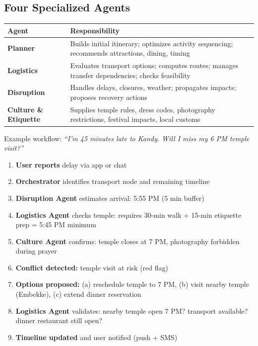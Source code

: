 \documentclass[11pt]{article}
\begin{document}
\subsection{Four Specialized Agents}

\begin{table}[H]\centering\small
\begin{tabular}{|l|p{3.5in}|}
\hline
\textbf{Agent} & \textbf{Responsibility} \\
\hline
\textbf{Planner} & Builds initial itinerary; optimizes activity sequencing; recommends attractions, dining, timing \\
\hline
\textbf{Logistics} & Evaluates transport options; computes routes; manages transfer dependencies; checks feasibility \\
\hline
\textbf{Disruption} & Handles delays, closures, weather; propagates impacts; proposes recovery actions \\
\hline
\textbf{Culture \& Etiquette} & Supplies temple rules, dress codes, photography restrictions, festival impacts, local customs \\
\hline
\end{tabular}
\end{table}

Example workflow: \textit{``I'm 45 minutes late to Kandy. Will I miss my 6 PM temple visit?''}

\begin{enumerate}
    \item \textbf{User reports} delay via app or chat
    \item \textbf{Orchestrator} identifies transport node and remaining timeline
    \item \textbf{Disruption Agent} estimates arrival: 5:55 PM (5 min buffer)
    \item \textbf{Logistics Agent} checks temple: requires 30-min walk + 15-min etiquette prep = 5:45 PM minimum
    \item \textbf{Culture Agent} confirms: temple closes at 7 PM, photography forbidden during prayer
    \item \textbf{Conflict detected:} temple visit at risk (red flag)
    \item \textbf{Options proposed:} (a) reschedule temple to 7 PM, (b) visit nearby temple (Embekke), (c) extend dinner reservation
    \item \textbf{Logistics Agent} validates: nearby temple open 7 PM? transport available? dinner restaurant still open?
    \item \textbf{Timeline updated} and user notified (push + SMS)
\end{enumerate}
\end{document}
